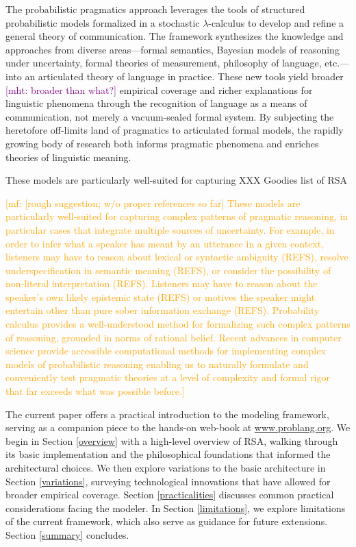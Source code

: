 \documentclass{sp}
\newcommand{\mf}[1]{\textcolor{orange}{[mf: #1]}}
\newcommand{\mht}[1]{\textcolor{purple}{[mht: #1]}}
\begin{document}
The probabilistic pragmatics approach leverages the tools of structured probabilistic models formalized in a stochastic $\lambda$-calculus to develop and refine a general theory of communication. The framework synthesizes the knowledge and approaches from diverse areas---formal semantics, Bayesian models of reasoning under uncertainty, formal theories of measurement, philosophy of language, etc.---into an articulated theory of language in practice. These new tools yield broader \mht{broader than what?} empirical coverage and richer explanations for linguistic phenomena through the recognition of language as a means of communication, not merely a vacuum-sealed formal system. By subjecting the heretofore off-limits land of pragmatics to articulated formal models, the rapidly growing body of research both informs pragmatic phenomena and enriches theories of linguistic meaning.

These models are particularly well-suited for capturing XXX Goodies list of RSA

\mf{[rough suggestion; w/o proper references so far] These models are particularly well-suited for capturing complex patterns of pragmatic reasoning, in particular cases that integrate multiple sources of uncertainty. For example, in order to infer what a speaker has meant by an utterance in a given context, listeners may have to reason about lexical or syntactic ambiguity (REFS), resolve underspecification in semantic meaning (REFS), or consider the possibility of non-literal interpretation (REFS). Listeners may have to reason about the speaker's own likely epistemic state (REFS) or motives the speaker might entertain other than pure sober information exchange (REFS). Probability calculus provides a well-understood method for formalizing such complex patterns of reasoning, grounded in norms of rational belief. Recent advances in computer science provide accessible computational methods for implementing complex models of probabilistic reasoning enabling us to naturally formulate and conveniently test pragmatic theories at a level of complexity and formal rigor that far exceeds what was possible before.}

The current paper offers a practical introduction to the modeling framework, serving as a companion piece to the hands-on web-book at \href{https://www.problang.org}{www.problang.org}. We begin in Section \ref{overview} with a high-level overview of RSA, walking through its basic implementation and the philosophical foundations that informed the architectural choices. We then explore variations to the basic architecture in Section \ref{variations}, surveying technological innovations that have allowed for broader empirical coverage. Section \ref{practicalities} discusses common practical considerations facing the modeler. In Section \ref{limitations}, we explore limitations of the current framework, which also serve as guidance for future extensions. Section \ref{summary} concludes.
\end{document}
